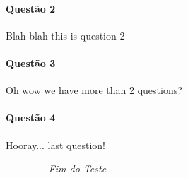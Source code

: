 \documentclass[a4paper,12pt,fleqn]{article}
\newcommand{\lastwords}{Fim do Teste}
\begin{document}
\paragraph{\textbf{Questão 2}}
Blah blah this is question 2

\paragraph{\textbf{Questão 3}}
Oh wow we have more than 2 questions? 

\paragraph{Questão 4} Hooray... last question!


\begin{center}
\vspace{3cm}
------------ \textit{\lastwords} ------------
\end{center}


\label{finalpage}
\end{document}
